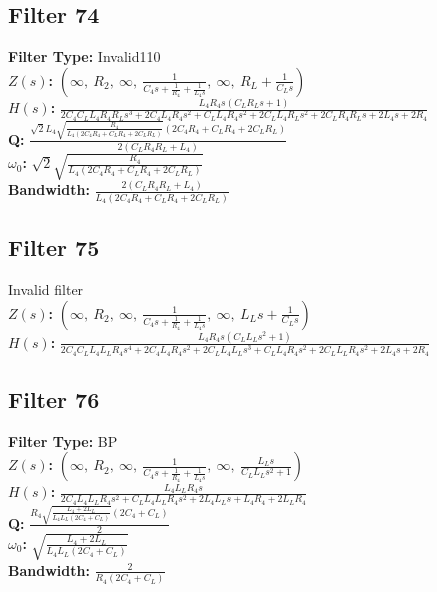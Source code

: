 \documentclass{article}
\begin{document}
\subsection*{Filter 74}
\textbf{Filter Type:} Invalid110 \\ 
\textbf{$Z(s)$:} $\left( \infty, \  R_{2}, \  \infty, \  \frac{1}{C_{4} s + \frac{1}{R_{4}} + \frac{1}{L_{4} s}}, \  \infty, \  R_{L} + \frac{1}{C_{L} s}\right)$ \\ 
\textbf{$H(s)$:} $\frac{L_{4} R_{4} s \left(C_{L} R_{L} s + 1\right)}{2 C_{4} C_{L} L_{4} R_{4} R_{L} s^{3} + 2 C_{4} L_{4} R_{4} s^{2} + C_{L} L_{4} R_{4} s^{2} + 2 C_{L} L_{4} R_{L} s^{2} + 2 C_{L} R_{4} R_{L} s + 2 L_{4} s + 2 R_{4}}$ \\ 
\textbf{Q:} $\frac{\sqrt{2} L_{4} \sqrt{\frac{R_{4}}{L_{4} \left(2 C_{4} R_{4} + C_{L} R_{4} + 2 C_{L} R_{L}\right)}} \left(2 C_{4} R_{4} + C_{L} R_{4} + 2 C_{L} R_{L}\right)}{2 \left(C_{L} R_{4} R_{L} + L_{4}\right)}$ \\ 
\textbf{$\omega_0$:} $\sqrt{2} \sqrt{\frac{R_{4}}{L_{4} \left(2 C_{4} R_{4} + C_{L} R_{4} + 2 C_{L} R_{L}\right)}}$ \\ 
\textbf{Bandwidth:} $\frac{2 \left(C_{L} R_{4} R_{L} + L_{4}\right)}{L_{4} \left(2 C_{4} R_{4} + C_{L} R_{4} + 2 C_{L} R_{L}\right)}$ \\ 
\subsection*{Filter 75}
Invalid filter \\ 
\textbf{$Z(s)$:} $\left( \infty, \  R_{2}, \  \infty, \  \frac{1}{C_{4} s + \frac{1}{R_{4}} + \frac{1}{L_{4} s}}, \  \infty, \  L_{L} s + \frac{1}{C_{L} s}\right)$ \\ 
\textbf{$H(s)$:} $\frac{L_{4} R_{4} s \left(C_{L} L_{L} s^{2} + 1\right)}{2 C_{4} C_{L} L_{4} L_{L} R_{4} s^{4} + 2 C_{4} L_{4} R_{4} s^{2} + 2 C_{L} L_{4} L_{L} s^{3} + C_{L} L_{4} R_{4} s^{2} + 2 C_{L} L_{L} R_{4} s^{2} + 2 L_{4} s + 2 R_{4}}$ \\ 
\subsection*{Filter 76}
\textbf{Filter Type:} BP \\ 
\textbf{$Z(s)$:} $\left( \infty, \  R_{2}, \  \infty, \  \frac{1}{C_{4} s + \frac{1}{R_{4}} + \frac{1}{L_{4} s}}, \  \infty, \  \frac{L_{L} s}{C_{L} L_{L} s^{2} + 1}\right)$ \\ 
\textbf{$H(s)$:} $\frac{L_{4} L_{L} R_{4} s}{2 C_{4} L_{4} L_{L} R_{4} s^{2} + C_{L} L_{4} L_{L} R_{4} s^{2} + 2 L_{4} L_{L} s + L_{4} R_{4} + 2 L_{L} R_{4}}$ \\ 
\textbf{Q:} $\frac{R_{4} \sqrt{\frac{L_{4} + 2 L_{L}}{L_{4} L_{L} \left(2 C_{4} + C_{L}\right)}} \left(2 C_{4} + C_{L}\right)}{2}$ \\ 
\textbf{$\omega_0$:} $\sqrt{\frac{L_{4} + 2 L_{L}}{L_{4} L_{L} \left(2 C_{4} + C_{L}\right)}}$ \\ 
\textbf{Bandwidth:} $\frac{2}{R_{4} \left(2 C_{4} + C_{L}\right)}$ \\ 
\end{document}

